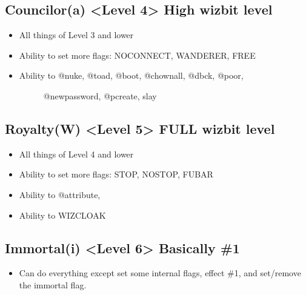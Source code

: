 \documentclass[letterpaper,10pt,english]{sphinxmanual}
\begin{document}
\subsection{Councilor(a) \textless{}Level 4\textgreater{} \sphinxhyphen{} High wizbit level}
\label{\detokenize{29-setup:councilor-a-level-4-high-wizbit-level}}\begin{itemize}
\item {} 
\sphinxAtStartPar
All things of Level 3 and lower

\item {} 
\sphinxAtStartPar
Ability to set more flags: NOCONNECT, WANDERER, FREE

\item {} \begin{description}
\item[{Ability to @nuke, @toad, @boot, @chownall, @dbck, @poor,}] \leavevmode
\sphinxAtStartPar
@newpassword, @pcreate, slay

\end{description}

\end{itemize}


\subsection{Royalty(W) \textless{}Level 5\textgreater{} \sphinxhyphen{} FULL wizbit level}
\label{\detokenize{29-setup:royalty-w-level-5-full-wizbit-level}}\begin{itemize}
\item {} 
\sphinxAtStartPar
All things of Level 4 and lower

\item {} 
\sphinxAtStartPar
Ability to set more flags: STOP, NOSTOP, FUBAR

\item {} 
\sphinxAtStartPar
Ability to @attribute,

\item {} 
\sphinxAtStartPar
Ability to WIZCLOAK

\end{itemize}


\subsection{Immortal(i) \textless{}Level 6\textgreater{} \sphinxhyphen{} Basically \#1}
\label{\detokenize{29-setup:immortal-i-level-6-basically-1}}\begin{itemize}
\item {} 
\sphinxAtStartPar
Can do everything except set some internal flags, effect \#1,
and set/remove the immortal flag.

\end{itemize}
\end{document}
